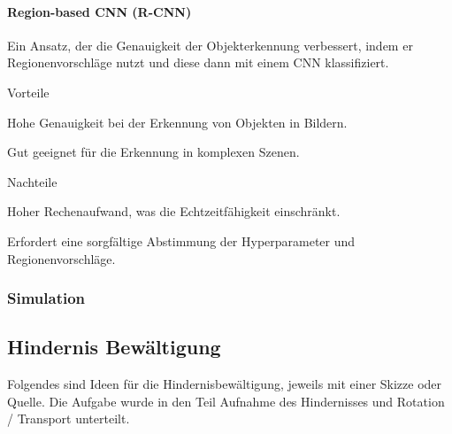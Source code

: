 \paragraph{Region-based CNN (R-CNN)}

Ein Ansatz, der die Genauigkeit der Objekterkennung verbessert, indem er Regionenvorschläge nutzt und diese dann mit einem CNN klassifiziert.

\begin{minipage}[t]{0.48\textwidth}
    \begin{items}
      \item [Vorteile]
      \item Hohe Genauigkeit bei der Erkennung von Objekten in Bildern.
      \item Gut geeignet für die Erkennung in komplexen Szenen.
    \end{items}
\end{minipage}
\hfill
\begin{minipage}[t]{0.48\textwidth}
    \begin{items}
      \item [Nachteile]
      \item Hoher Rechenaufwand, was die Echtzeitfähigkeit einschränkt.
      \item Erfordert eine sorgfältige Abstimmung der Hyperparameter und Regionenvorschläge.
    \end{items}
\end{minipage}



\subsubsection{Simulation}


\newpage
\subsection{Hindernis Bewältigung}
Folgendes sind Ideen für die Hindernisbewältigung, jeweils mit einer Skizze oder Quelle. Die Aufgabe wurde in den Teil Aufnahme des Hindernisses und Rotation / Transport unterteilt.
